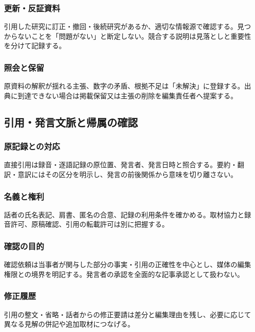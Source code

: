 \documentclass[a4paper,11pt]{article}
\begin{document}
\subsubsection{更新・反証資料}
\par 引用した研究に訂正・撤回・後続研究があるか、適切な情報源で確認する。見つからないことを「問題がない」と断定しない。競合する説明は見落としと重要性を分けて記録する。\par\medskip
\subsubsection{照会と保留}
\par 原資料の解釈が揺れる主張、数字の矛盾、根拠不足は「未解決」に登録する。出典に到達できない場合は掲載保留又は主張の削除を編集責任者へ提案する。\par\medskip
\subsection{引用・発言文脈と帰属の確認}
\subsubsection{原記録との対応}
\par 直接引用は録音・逐語記録の原位置、発言者、発言日時と照合する。要約・翻訳・意訳にはその区分を明示し、発言の前後関係から意味を切り離さない。\par\medskip
\subsubsection{名義と権利}
\par 話者の氏名表記、肩書、匿名の合意、記録の利用条件を確かめる。取材協力と録音許可、原稿確認、引用の転載許可は別に把握する。\par\medskip
\subsubsection{確認の目的}
\par 確認依頼は当事者が関与した部分の事実・引用の正確性を中心とし、媒体の編集権限との境界を明記する。発言者の承認を全面的な記事承認として扱わない。\par\medskip
\subsubsection{修正履歴}
\par 引用の整文・省略・話者からの修正要請は差分と編集理由を残し、必要に応じて異なる見解の併記や追加取材につなげる。\par\medskip
\end{document}
